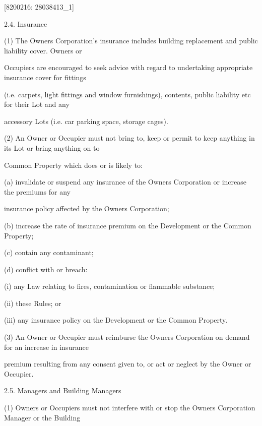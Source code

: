 \documentclass{article}
\begin{document}
{\fontsize{7.02}{1}[8200216: 28038413\_1] }

{\fontsize{9.99}{1}2.4. Insurance }


{\fontsize{9.962}{1}(1) The Owners Corporation’s insurance includes building replacement and public liability cover. Owners or }

{\fontsize{10.02}{1}Occupiers are encouraged to seek advice with regard to undertaking appropriate insurance cover for fittings }

{\fontsize{10.02}{1}(i.e. carpets, light fittings and window furnishings), contents, public liability etc for their Lot and any }

{\fontsize{10.02}{1}accessory Lots (i.e. car parking space, storage cages). }

{\fontsize{9.962}{1}(2) An Owner or Occupier must not bring to, keep or permit to keep anything in its Lot or bring anything on to }

{\fontsize{10.02}{1}Common Property which does or is likely to: }

{\fontsize{9.962}{1}(a) invalidate or suspend any insurance of the Owners Corporation or increase the premiums for any }

{\fontsize{10.02}{1}insurance policy affected by the Owners Corporation; }

{\fontsize{9.962}{1}(b) increase the rate of insurance premium on the Development or the Common Property; }

{\fontsize{9.962}{1}(c) contain any contaminant; }

{\fontsize{9.962}{1}(d) conflict with or breach: }

{\fontsize{9.962}{1}(i) any Law relating to fires, contamination or flammable substance; }

{\fontsize{9.962}{1}(ii) these Rules; or }

{\fontsize{9.962}{1}(iii) any insurance policy on the Development or the Common Property. }

{\fontsize{9.962}{1}(3) An Owner or Occupier must reimburse the Owners Corporation on demand for an increase in insurance }

{\fontsize{10.02}{1}premium resulting from any consent given to, or act or neglect by the Owner or Occupier. }

{\fontsize{9.99}{1}2.5. Managers and Building Managers }

{\fontsize{9.962}{1}(1) Owners or Occupiers must not interfere with or stop the Owners Corporation Manager or the Building }
\end{document}
